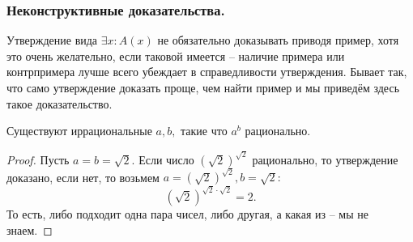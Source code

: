 \subsubsection{Неконструктивные доказательства.}

Утверждение вида $\exists x : A(x)$ не обязательно доказывать приводя пример, хотя это очень желательно, если таковой имеется -- наличие примера или контрпримера лучше всего убеждает в справедливости утверждения. Бывает так, что само утверждение доказать проще, чем найти пример и мы приведём здесь такое доказательство.

\begin{example}
    Существуют иррациональные $a, b,$ такие что $a ^ b$ рационально. 
\end{example}

\begin{proof}
    Пусть $a = b = \sqrt{2}.$ Если число $(\sqrt{2})^{\sqrt{2}}$ рационально, то утверждение доказано, если нет, то возьмем $a = (\sqrt{2})^{\sqrt{2}}, b = \sqrt{2}:$
    $$(\sqrt{2})^{\sqrt{2} \cdot \sqrt{2}} = 2.$$
    То есть, либо подходит одна пара чисел, либо другая, а какая из -- мы не знаем.
\end{proof}